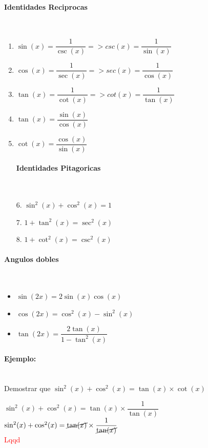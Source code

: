 \documentclass[stu, 12pt, a4paper, donotrepeattitle, floatsintext, natbib]{apa7}
\begin{document}
    \begin{paracol}{2}
        \paragraph{Identidades Reciprocas}\\
        \begin{enumerate}
            \item $\sin(x) = \dfrac{1}{\csc(x)} => csc(x) = \dfrac{1}{\sin(x)}$
            \item $\cos(x) = \dfrac{1}{\sec(x)} => sec(x) = \dfrac{1}{\cos(x)}$
            \item $\tan(x) = \dfrac{1}{\cot(x)} => cot(x) = \dfrac{1}{\tan(x)}$

            \item $\tan(x) = \dfrac{\sin(x)}{\cos(x)}$
            \item $\cot(x) = \dfrac{\cos(x)}{\sin(x)}$

            \switchcolumn

            \paragraph{Identidades Pitagoricas}\\
            \item[6.] $\sin^2(x) + \cos^2(x) = 1$
            \item[7.] $1 + \tan^2(x) = \sec^2(x)$
            \item[8.] $1 + \cot^2(x) = \csc^2(x)$
        \end{enumerate}
    \end{paracol}

    \paragraph{Angulos dobles}\\
    \begin{itemize}
        \item $\sin(2x) = 2\sin(x)\cos(x)$
        \item $\cos(2x) = \cos^2(x) - \sin^2(x)$
        \item $\tan(2x) = \dfrac{2\tan(x)}{1-\tan^2(x)}$
    \end{itemize}

    \paragraph{Ejemplo:}\\
    Demostrar que $\sin^2(x) + \cos^2(x) = \tan(x) \times \cot(x)$\\[0.5cm]
    \begin{paracol}{2}
        $\sin^2(x) + \cos^2(x) = \tan(x) \times \dfrac{1}{\tan(x)}$\\[0.5cm]
        $\sin^2(x) + \cos^2(x) = \cancel{\tan(x)} \times \dfrac{1}{\cancel{\tan(x)}}$\\[0.5cm]
        \switchcolumn
        \textcolor{red}{Lqqd} 
    \end{paracol}
    \newpage
\end{document}
